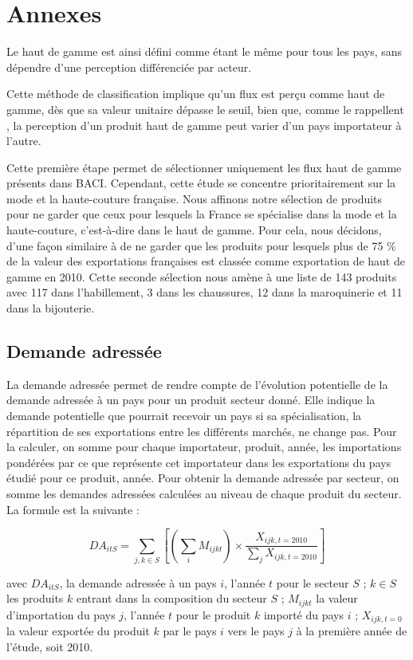 \documentclass[french,10pt,a4paper]{article}
\newenvironment{annexes}{
    \section*{Annexes}
    \addcontentsline{toc}{section}{Annexes}
    \setstretch{2} %
}{
    \setstretch{1} %
}
\begin{document}
\begin{annexes}
Le haut de gamme est ainsi défini comme étant le même pour tous les pays, sans dépendre d'une perception différenciée par acteur. 

Cette méthode de classification implique qu'un flux est perçu comme haut de gamme, dès que sa valeur unitaire dépasse le seuil, bien que, comme le rappellent \cite{Martin2015}, la perception d'un produit haut de gamme peut varier d'un pays importateur à l'autre. 

Cette première étape permet de sélectionner uniquement les flux haut de gamme présents dans BACI. Cependant, cette étude se concentre prioritairement sur la mode et la haute-couture française. Nous affinons notre sélection de produits pour ne garder que ceux pour lesquels la France se spécialise dans la mode et la haute-couture, c'est-à-dire dans le haut de gamme. Pour cela, nous décidons, d'une façon similaire à \cite{Martin2015} de ne garder que les produits pour lesquels plus de 75 \% de la valeur des exportations françaises est classée comme exportation de haut de gamme en 2010. Cette seconde sélection nous amène à une liste de 143 produits avec 117 dans l'habillement, 3 dans les chaussures, 12 dans la maroquinerie et 11 dans la bijouterie.

\subsection*{Demande adressée}

La demande adressée permet de rendre compte de l'évolution potentielle de la demande adressée à un pays pour un produit secteur donné. Elle indique la demande potentielle que pourrait recevoir un pays si sa spécialisation, la répartition de ses exportations entre les différents marchés, ne change pas. Pour la calculer, on somme pour chaque importateur, produit, année, les importations pondérées par ce que représente cet importateur dans les exportations du pays étudié pour ce produit, année. Pour obtenir la demande adressée par secteur, on somme les demandes adressées calculées au niveau de chaque produit du secteur. La formule est la suivante :

\begin{equation}
\label{eq:1}
DA_{itS} = \sum_{j,k \in S} \left[ \left( \sum_{i} M_{ijkt} \right) \times \frac{X_{ijk,t=2010}}{\sum_{j}X_{ijk,t=2010}}\right]  
\end{equation}

\noindent avec $DA_{itS}$, la demande adressée à un pays $i$, l'année $t$ pour le secteur $S$ ; $k \in S$ les produits $k$ entrant dans la composition du secteur $S$ ; $M_{ijkt}$ la valeur d'importation du pays $j$, l'année $t$ pour le produit $k$ importé du pays $i$ ; $X_{ijk, t=0}$ la valeur exportée du produit $k$ par le pays $i$ vers le pays $j$ à la première année de l'étude, soit 2010.


\end{annexes}
\end{document}
